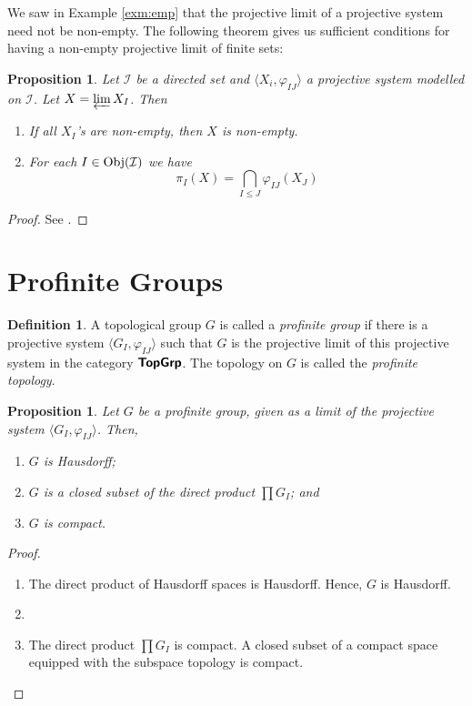 \documentclass[12pt]{article}
\newtheorem{prop}[thm]{Proposition}
\theoremstyle{definition}
\newtheorem{dfn}[thm]{Definition}
\theoremstyle{remark}
\newcommand{\catvar}[1]{\mathcal{#1}}
\newcommand{\II}{\catvar{I}}
\newcommand{\catname}[1]{\textup{\sffamily\textbf{#1}}}
\newcommand{\Obj}[1]{\textup{Obj}(#1)}
\begin{document}
    We saw in Example \ref{exm:emp} that the projective limit of a projective system need not be non-empty. The following theorem gives us sufficient conditions for having a non-empty projective limit of finite sets:
    
    \begin{prop}
        Let $\II$ be a directed set and $\langle X_i,\varphi_{IJ}\rangle$ a projective system modelled on $\II$. Let $X=\varprojlim X_I$. Then
        \begin{enumerate}[label=(\roman*)]
            \item If all $X_I$'s are non-empty, then $X$ is non-empty.
            \item For each $I\in\Obj{\II}$ we have
            $$ \pi_I(X) =\bigcap_{I\leq J}\varphi_{IJ}(X_J) $$
        \end{enumerate}
    \end{prop}

    \begin{proof}
        See \cite[Proposition 1-11]{FANF1999}.
    \end{proof}

    \section{Profinite Groups}

    \begin{dfn}
        A topological group $G$ is called a \emph{profinite group} if there is a projective system $\langle G_I,\varphi_{IJ}\rangle$ such that $G$ is the projective limit of this projective system in the category $\catname{TopGrp}$. The topology on $G$ is called the \emph{profinite topology}.
    \end{dfn}

    \begin{prop}
        Let $G$ be a profinite group, given as a limit of the projective system $\langle G_I,\varphi_{IJ}\rangle$. Then,
        \begin{enumerate}[label=(\alph*)]
            \item $G$ is Hausdorff;
            \item $G$ is a closed subset of the direct product $\prod G_I$; and
            \item $G$ is compact.
        \end{enumerate}
    \end{prop}
    \begin{proof}
        \begin{enumerate}[label=(\alph*)]
            \item The direct product of Hausdorff spaces is Hausdorff. Hence, $G$ is Hausdorff.
            \item %
            \item The direct product $\prod G_I$ is compact. A closed subset of a compact space equipped with the subspace topology is compact.
        \end{enumerate}
    \end{proof}
\end{document}
